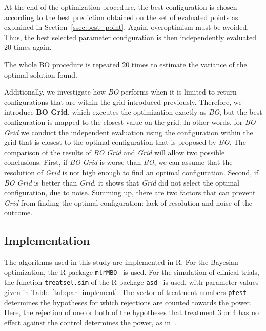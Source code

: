 \documentclass[bimj,fleqn]{w-art}
\theoremstyle{plain}
\theoremstyle{definition}
\begin{document}
At the end of the optimization procedure, the best configuration is chosen according to the best prediction obtained on the set of evaluated points as explained in Section~\ref{ssec:best_point}.
Again, overoptimism must be avoided. 
Thus, the best selected parameter configuration is then independently evaluated $20$ times again.

The whole BO procedure is repeated $20$ times to estimate the variance of the optimal solution found.

Additionally, we investigate how \emph{BO} performs when it is limited to return configurations that are within the grid introduced previously.
Therefore, we introduce \textbf{BO Grid}, which executes the optimization exactly as \emph{BO}, but the best configuration is mapped to the closest value on the grid. 
In other words, for \emph{BO Grid} we conduct the independent evaluation using the configuration within the grid that is closest to the optimal configuration that is proposed by \emph{BO}.
The comparison of the results of \emph{BO Grid} and \emph{Grid} will allow two possible conclusions:
First, if \emph{BO Grid} is worse than \emph{BO}, we can assume that the resolution of \emph{Grid} is not high enough to find an optimal configuration.
Second, if \emph{BO Grid} is better than \emph{Grid}, it shows that \emph{Grid} did not select the optimal configuration, due to noise.
Summing up, there are two factors that can prevent \emph{Grid} from finding the optimal configuration: lack of resolution and noise of the outcome.

\subsection{Implementation}

The algorithms used in this study are implemented in R.
For the Bayesian optimization, the R-package \texttt{mlrMBO}~\citep{bischl_mlrmbo_2017} is used.
For the simulation of clinical trials, the function \texttt{treatsel.sim} of the R-package \texttt{asd}~\citep{parsons_package_2012} is used, with parameter values given in Table~\ref{tab:par_implement}.
The vector of treatment numbers \texttt{ptest} determines the hypotheses for which rejections are counted towards the power.
Here, the rejection of one or both of the hypotheses that treatment 3 or 4 has no effect against the control determines the power, as in~\citet{friede_adaptive_2020}.
\end{document}
